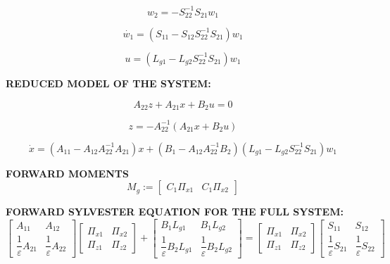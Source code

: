 \documentclass{article}
\begin{document}
\begin{equation}
w_2 = -S_{22} ^{-1} S_{21} w_1
\end{equation}

\begin{equation}
\dot{w_1} = (S_{11}-S_{12} S_{22} ^{-1} S_{21}) w_1
\end{equation}

\begin{equation}
u = (L_{g1} - L_{g2} S_{22} ^ {-1} S_{21}) w_1
\end{equation} 

\textbf{REDUCED MODEL OF THE SYSTEM:}

\begin{equation}
A_{22} z + A_{21} x + B_2 u = 0
\end{equation}

\begin{equation}
z = -A_{22} ^{-1} \left( A_{21} x + B_2 u \right)
\end{equation}

\begin{equation}
\dot{x} = (A_{11}-A_{12} A_{22} ^{-1} A_{21}) x + (B_1 - A_{12} A_{22}^{-1} B_2) (L_{g1} - L_{g2} S_{22} ^ {-1} S_{21}) w_1
\end{equation}

\textbf{FORWARD MOMENTS}
\begin{equation}
M_g :=
\begin{bmatrix}
    C_1 \Pi_{x1} & C_1 \Pi_{x2}
\end{bmatrix}
\end{equation}

\textbf{FORWARD SYLVESTER EQUATION FOR THE FULL SYSTEM:}
\begin{equation}
\left[
\begin{array}{cc}
A_{11} & A_{12} \\
\dfrac{1}{\varepsilon} A_{21} & \dfrac{1}{\varepsilon} A_{22}
\end{array}
\right]
\left[
\begin{array}{cc}
\Pi_{x1} & \Pi_{x2} \\
\Pi_{z1} & \Pi_{z2}
\end{array}
\right]
+
\left[
\begin{array}{cc}
B_{1} L_{g1} & B_{1} L_{g2} \\
\dfrac{1}{\varepsilon} B_{2} L_{g1} & \dfrac{1}{\varepsilon} B_{2} L_{g2}
\end{array}
\right]
=
\left[
\begin{array}{cc}
\Pi_{x1} & \Pi_{x2} \\
\Pi_{z1} & \Pi_{z2}
\end{array}
\right]
\left[
\begin{array}{cc}
S_{11} & S_{12} \\
\dfrac{1}{\varepsilon} S_{21} & \dfrac{1}{\varepsilon} S_{22}
\end{array}
\right]
\end{equation}
\end{document}
